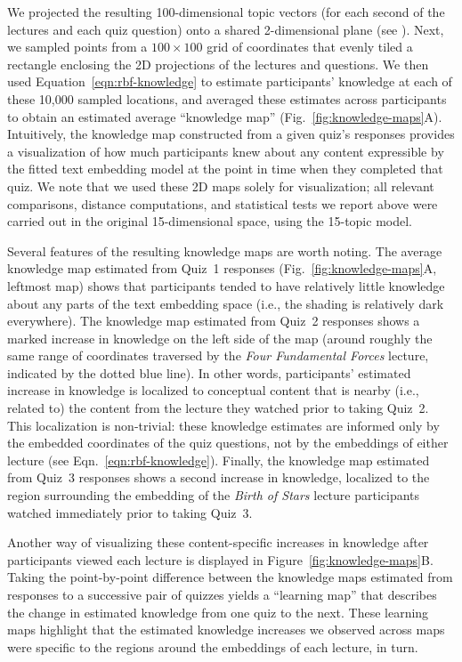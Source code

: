 \documentclass[10pt]{article}
\renewcommand{\nameref}[1]{\textit{\oldnameref{#1}}}
\begin{document}
We projected the resulting 100-dimensional topic vectors (for each second of
the lectures and each quiz question) onto a shared 2-dimensional plane (see
\nameref{subsec:knowledge-maps}). Next, we sampled points from a $100 \times
100$ grid of coordinates that evenly tiled a rectangle enclosing the 2D
projections of the lectures and questions. We then used
Equation~\ref{eqn:rbf-knowledge} to estimate participants' knowledge at each of
these 10,000 sampled locations, and averaged these estimates across
participants to obtain an estimated average ``knowledge map''
(Fig.~\ref{fig:knowledge-maps}A). Intuitively, the knowledge map constructed
from a given quiz's responses provides a visualization of how much
participants knew about any content expressible by the fitted text embedding
model at the point in time when they completed that quiz.
We note that we used these 2D maps solely for visualization; all relevant
comparisons, distance computations, and statistical tests we report above were
carried out in the original 15-dimensional space, using the 15-topic model.

Several features of the resulting knowledge maps are worth noting. The average
knowledge map estimated from Quiz~1 responses (Fig.~\ref{fig:knowledge-maps}A,
leftmost map) shows that participants tended to have relatively little
knowledge about any parts of the text embedding space (i.e., the shading is
relatively dark everywhere). The knowledge map estimated from Quiz~2 responses
shows a marked increase in knowledge on the left side of the map (around
roughly the same range of coordinates traversed by the \textit{Four Fundamental
Forces} lecture, indicated by the dotted blue line). In other words,
participants' estimated increase in knowledge is localized to conceptual
content that is nearby (i.e., related to) the content from the lecture they
watched prior to taking Quiz~2. This localization is non-trivial: these
knowledge estimates are informed only by the embedded coordinates of the
quiz questions, not by the embeddings of either lecture (see
Eqn.~\ref{eqn:rbf-knowledge}). Finally, the knowledge map estimated from Quiz~3
responses shows a second increase in knowledge, localized to the region
surrounding the embedding of the \textit{Birth of Stars} lecture participants
watched immediately prior to taking Quiz~3.

Another way of visualizing these content-specific increases in knowledge after
participants viewed each lecture is displayed in
Figure~\ref{fig:knowledge-maps}B. Taking the point-by-point difference between
the knowledge maps estimated from responses to a successive pair of quizzes
yields a ``learning map'' that describes the change in estimated
knowledge from one quiz to the next. These learning maps highlight that the
estimated knowledge increases we observed across maps were specific to the
regions around the embeddings of each lecture, in turn.
\end{document}
